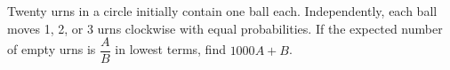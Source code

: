 Twenty urns in a circle initially contain one ball each. Independently, each ball moves 1, 2, or 3 urns clockwise with equal probabilities. If the expected number of empty urns is $\dfrac{A}{B}$ in lowest terms, find $1000A+B$.
